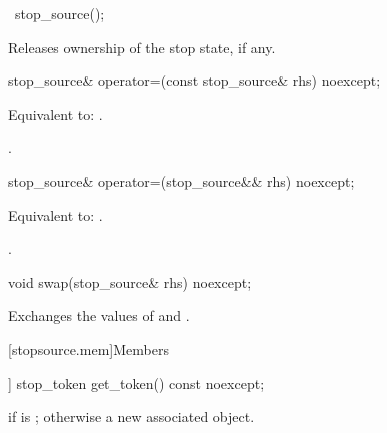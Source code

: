 %
\begin{itemdecl}
~stop_source();
\end{itemdecl}

\begin{itemdescr}
\pnum
\effects Releases ownership of the stop state, if any.
\end{itemdescr}

%
\begin{itemdecl}
stop_source& operator=(const stop_source& rhs) noexcept;
\end{itemdecl}

\begin{itemdescr}
\pnum
\effects Equivalent to: .

\pnum
\returns {}.
\end{itemdescr}

%
\begin{itemdecl}
stop_source& operator=(stop_source&& rhs) noexcept;
\end{itemdecl}

\begin{itemdescr}
\pnum
\effects Equivalent to: .

\pnum
\returns {}.
\end{itemdescr}

%
\begin{itemdecl}
void swap(stop_source& rhs) noexcept;
\end{itemdecl}

\begin{itemdescr}
\pnum
\effects Exchanges the values of  and .
\end{itemdescr}

[stopsource.mem]{Members}

%
\begin{itemdecl}
[[nodiscard]] stop_token get_token() const noexcept;
\end{itemdecl}

\begin{itemdescr}
\pnum
\returns
{} if  is ;
otherwise a new associated  object.
\end{itemdescr}


